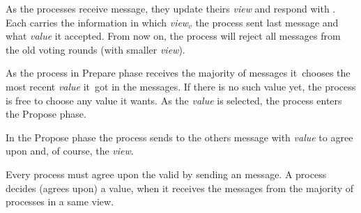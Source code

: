 As the processes receive \prepare message, they update theirs \textit{view} and respond with \prepareOK[]. Each \prepareOK carries the information in which \textit{view}$_v$ the process sent last \accept message and what \textit{value} it accepted. From now on, the process will reject all messages from the old voting rounds (with smaller \textit{view}).

As the process in Prepare phase receives the majority of \prepareOK messages it~chooses the most recent \textit{value} it~got in the messages. If there is no such value yet, the process is free to choose any value it wants. As the \textit{value} is selected, the process enters the Propose phase.

In the Propose phase the process sends to the others \propose message with \textit{value} to agree upon and, of course, the \textit{view}.

Every process must agree upon the valid \propose by sending an \accept message.
A process decides (agrees upon) a value, when it receives the \accept messages from the majority of processes in a same view.


